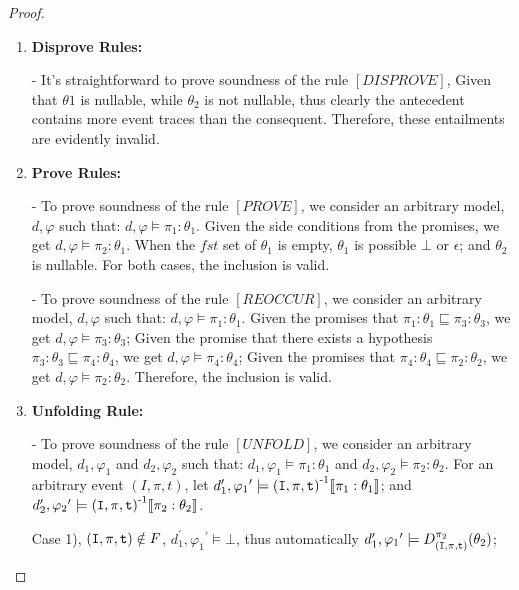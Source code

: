 \documentclass[acmsmall,10pt,review]{acmart}
\newcommand{\es}{\theta}
\newcommand{\code}[1]{{\tt{\ensuremath{\m{#1}}}}}
\newcommand{\codeme}[1]{{\tt{\ensuremath{#1}}}}
\newcommand{\CONTAIN}{\sqsubseteq}
\newcommand{\m}{\mathit}
\begin{document}
{{{\begin{proof}
\begin{enumerate}
  
  \item \textbf{Disprove Rules:} 
  
  - It's straightforward to prove soundness of the rule \codeme{[DISPROVE]}, Given that \codeme{ \es1} is nullable, while \codeme{ \es_2} is not nullable, thus clearly the antecedent contains more event traces than the consequent.  Therefore, these entailments are evidently invalid.\\
  
  
  \item \textbf{Prove Rules:} 
  
  - To prove soundness of the rule \code{[PROVE]}, we consider an arbitrary model, \codeme{d,  \varphi} such that:  \codeme{d,  \varphi \models  {\pi_1 : \es_1}}. Given the side conditions from the promises, we get \codeme{d,  \varphi \models {\pi_2 : \es_1}}. When the \code{\m{fst}} set of \code{\es_1} is empty, \code{\es_1} is possible \code{\bot} or \code{\epsilon}; and \code{\es_2} is nullable. For both cases, the inclusion is valid. 
  
  - To prove soundness of the rule \codeme{[REOCCUR]}, we consider an arbitrary model, \codeme{d,  \varphi} such that:  \codeme{d,  \varphi \models  {\pi_1 : \es_1}}. Given the promises that  \codeme{\pi_1 : \es_1 \CONTAIN \pi_3 : \es_3}, we get \codeme{d,  \varphi \models {\pi_3 : \es_3}}; Given the promise that there exists a hypothesis \codeme{\pi_3 : \es_3 \CONTAIN  \pi_4 : \es_4}, we get \codeme{d,  \varphi \models {\pi_4 : \es_4}}; Given the promises that  \codeme{\pi_4 : \es_4 \CONTAIN \pi_2 : \es_2}, we get \codeme{d,  \varphi \models {\pi_2 : \es_2}}. Therefore,  the inclusion is valid. 
  \\
  
  
  \item \textbf{Unfolding Rule:} 
  
  
  
  - To prove soundness of the rule \codeme{[UNFOLD]}, we consider an arbitrary model, \codeme{d_1,  \varphi_1} and \codeme{d_2,  \varphi_2}  such that:  \codeme{d_1,  \varphi_1 \models {\pi_1 : \es_1}} and \codeme{d_2,  \varphi_2 \models  {\pi_2 : \es_2}}. For an arbitrary event \codeme{(I, \pi, t)}, let \codeme{d_1^\prime, {\varphi_1}^\prime \models \codeme{(I, \pi, t)}^{\text{-}1}\llbracket  \pi_1: \es_1 \rrbracket}; and 
  \codeme{d_2^\prime, {\varphi_2}^\prime \models \codeme{(I, \pi, t)}^{\text{-}1}\llbracket \pi_2 : \es_2 \rrbracket}. 
  
  Case 1), \codeme{\codeme{(I, \pi, t)} \notin F}, \codeme{d_1^\prime, {\varphi_1}^\prime \models \bot }, thus automatically \codeme{d_1^\prime, {\varphi_1}^\prime \models D^{\pi_2}_{\codeme{(I, \pi, t)}}( \es_2)};
  

\end{enumerate}
\end{proof}}}}
\end{document}
